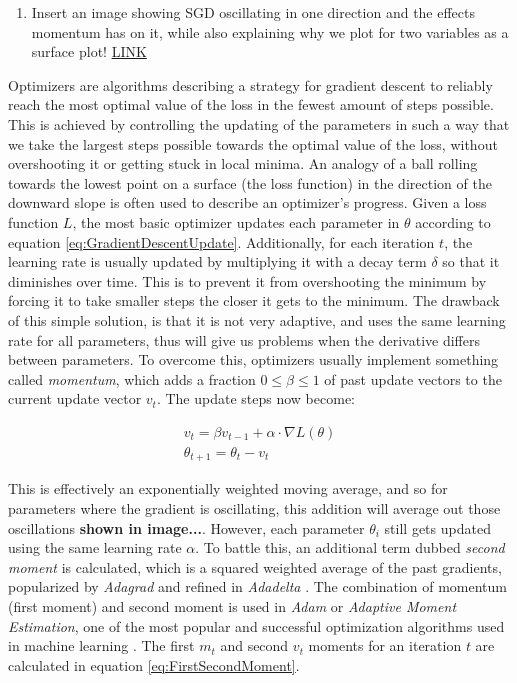 \begin{enumerate}
    \item Insert an image showing SGD oscillating in one direction and the effects momentum has on it, while also explaining why we plot for two variables as a surface plot! \href{https://ruder.io/optimizing-gradient-descent/index.html#gradientdescentoptimizationalgorithms}{LINK}
\end{enumerate}

Optimizers are algorithms describing a strategy for gradient descent to reliably reach the most optimal value of the loss in the fewest amount of steps possible. This is achieved by controlling the updating of the parameters in such a way that we take the largest steps possible towards the optimal value of the loss, without overshooting it or getting stuck in local minima. An analogy of a ball rolling towards the lowest point on a surface (the loss function) in the direction of the downward slope is often used to describe an optimizer's progress. Given a loss function $L$, the most basic optimizer updates each parameter in $\theta$ according to equation \ref{eq:GradientDescentUpdate}. Additionally, for each iteration $t$, the learning rate is usually updated by multiplying it with a decay term $\delta$ so that it diminishes over time. This is to prevent it from overshooting the minimum by forcing it to take smaller steps the closer it gets to the minimum. The drawback of this simple solution, is that it is not very adaptive, and uses the same learning rate for all parameters, thus will give us problems when the derivative differs between parameters. To overcome this, optimizers usually implement something called \textit{momentum}, which adds a fraction $0 \leq \beta \leq 1$ of past update vectors to the current update vector $v_t$. The update steps now become:

\begin{equation}
    \begin{aligned}
    v_t = \beta v_{t-1} + \alpha \cdot \nabla L(\theta) \\
    \theta_{t+1} = \theta_t - v_t
    \end{aligned}
\end{equation}

This is effectively an exponentially weighted moving average, and so for parameters where the gradient is oscillating, this addition will average out those oscillations \textbf{shown in image...}. However, each parameter $\theta_i$ still gets updated using the same learning rate $\alpha$. To battle this, an additional term dubbed \textit{second moment} is calculated, which is a squared weighted average of the past gradients, popularized by \textit{Adagrad} \cite{duchi_2011_adaptive} and refined in \textit{Adadelta} \cite{zeiler_2012_adadelta}. The combination of momentum (first moment) and second moment is used in \textit{Adam} or \textit{Adaptive Moment Estimation}, one of the most popular and successful optimization algorithms used in machine learning \cite{kingma_2014_adam}. The first $m_t$ and second $v_t$ moments for an iteration $t$ are calculated in equation \ref{eq:FirstSecondMoment}.

